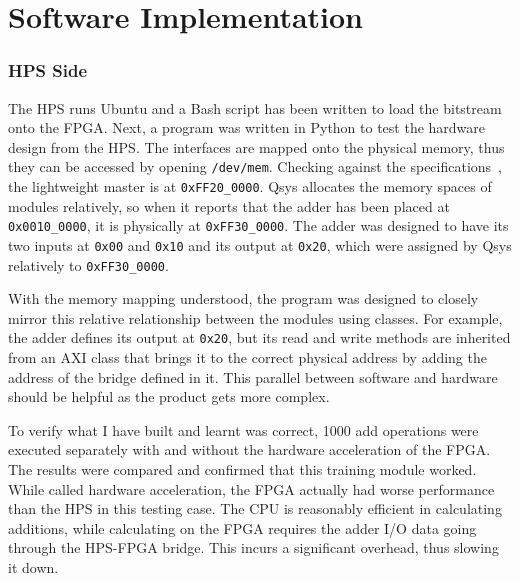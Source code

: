 \section{Software Implementation}

\subsubsection{HPS Side}
The HPS runs Ubuntu and a Bash script has been written to load the bitstream onto the FPGA.
Next, a program was written in Python to test the hardware design from the HPS.
The interfaces are mapped onto the physical memory, thus they can be accessed by opening \texttt{/dev/mem}.
Checking against the specifications~\cite{Altera6}, the lightweight master is at \texttt{0xFF20\_0000}.
Qsys allocates the memory spaces of modules relatively, so when it reports that the adder has been placed at \texttt{0x0010\_0000}, it is physically at \texttt{0xFF30\_0000}.
The adder was designed to have its two inputs at \texttt{0x00} and \texttt{0x10} and its output at \texttt{0x20}, which were assigned by Qsys relatively to \texttt{0xFF30\_0000}.

With the memory mapping understood, the program was designed to closely mirror this relative relationship between the modules using classes.
For example, the adder defines its output at \texttt{0x20}, but its read and write methods are inherited from an AXI class that brings it to the correct physical address by adding the address of the bridge defined in it.
This parallel between software and hardware should be helpful as the product gets more complex.

To verify what I have built and learnt was correct, 1000 add operations were executed separately with and without the hardware acceleration of the FPGA.
The results were compared and confirmed that this training module worked.
While called hardware acceleration, the FPGA actually had worse performance than the HPS in this testing case.
The CPU is reasonably efficient in calculating additions, while calculating on the FPGA requires the adder I/O data going through the HPS-FPGA bridge.
This incurs a significant overhead, thus slowing it down.
